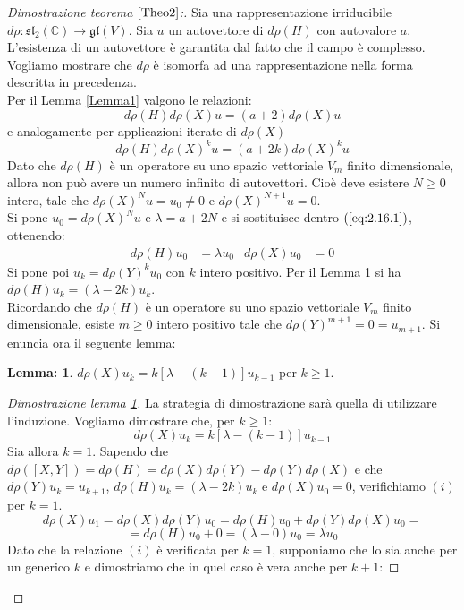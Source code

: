 \documentclass[12pt,a4paper]{report}
\theoremstyle{definition}
\theoremstyle{Theorem}
\theoremstyle{definition}
\theoremstyle{definition}
\newtheorem{Lem}[Def]{Lemma:}
\theoremstyle{definition}
\begin{document}
\begin{proof}[Dimostrazione teorema $\ref{Theo2}$:]
	Sia una rappresentazione irriducibile $d\rho:\mathfrak{sl_2(\mathbb{C})}\rightarrow \mathfrak{gl}(V)$. Sia $u$ un autovettore di $d\rho(H)$ con autovalore $a$. L'esistenza di un autovettore è garantita dal fatto che il campo è complesso. Vogliamo mostrare che $d\rho$ è isomorfa ad una rappresentazione nella forma descritta in precedenza.\\
	Per il Lemma \ref{Lemma1} valgono le relazioni: $$d\rho(H)d\rho(X)u=(a+2)d\rho(X)u$$ e analogamente per applicazioni iterate di $d\rho(X)$
	\begin{equation}
		\label{eq:2.16.1}
		d\rho(H)d\rho(X)^ku=(a+2k)d\rho(X)^ku
		\tag{1}
	\end{equation}
	Dato che $d\rho(H)$ è un operatore su uno spazio vettoriale $V_m$ finito dimensionale, allora non può avere un numero infinito di autovettori. Cioè deve esistere $N\geq 0$ intero, tale che $d\rho(X)^Nu=u_0\neq0$ e $d\rho(X)^{N+1}u=0$.\\
	Si pone $u_0=d\rho(X)^Nu$ e $\lambda=a+2N$ e si sostituisce dentro $(\ref{eq:2.16.1})$, ottenendo: 
	\begin{align*}
		d\rho(H)u_0&=\lambda u_0 & d\rho(X)u_0&=0
	\end{align*} 
	Si pone poi $u_k=d\rho(Y)^ku_0$ con $k$ intero positivo. Per il Lemma 1 si ha $d\rho(H)u_k=(\lambda-2k)u_k$.\\
	Ricordando che $d\rho(H)$ è un operatore su uno spazio vettoriale $V_m$ finito dimensionale, esiste $m\geq0$ intero positivo tale che  $d\rho(Y)^{m+1}=0=u_{m+1}$. Si enuncia ora il seguente lemma:
	\begin{Lem}\label{Lemma2}
		$d\rho(X)u_k=k[\lambda-(k-1)]u_{k-1}$ per $k\geq 1$.
	\end{Lem} 
\begin{proof} [Dimostrazione lemma \ref{Lemma2}]
	La strategia di dimostrazione sarà quella di utilizzare l'induzione.
	Vogliamo dimostrare che, per $k\geq 1$:
	\begin{equation}
		\label{eq:4}
		d\rho(X)u_k=k[\lambda-(k-1)]u_{k-1} 
		\tag{i}
	\end{equation}
	Sia allora $k=1$. Sapendo che $d\rho([X,Y])=d\rho(H)=d\rho(X)d\rho(Y)-d\rho(Y)d\rho(X)$ e che $d\rho(Y)u_k=u_{k+1}$, $d\rho(H)u_k=(\lambda-2k)u_k$ e $d\rho(X)u_0=0$, verifichiamo $(i)$ per $k=1$.
	$$d\rho(X)u_1=d\rho(X)d\rho(Y)u_0=d\rho(H)u_0+d\rho(Y)d\rho(X)u_0=$$$$=d\rho(H)u_0+0=(\lambda-0)u_0=\lambda u_0$$
	Dato che la relazione $(i)$ è verificata per $k=1$, supponiamo che lo sia anche per un generico $k$ e dimostriamo che in quel caso è vera anche per $k+1$:

\end{proof}
\end{proof}
\end{document}
